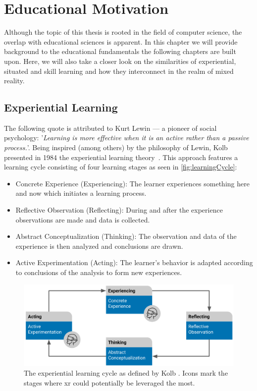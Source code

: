 %
\chapter{Educational Motivation \label{chap:concepts}}
Although the topic of this thesis is rooted in the field of computer science, the overlap with educational sciences is apparent. In this chapter we will provide background to the educational fundamentals the following chapters are built upon. Here, we will also take a closer look on the similarities of experiential, situated and skill learning and how they interconnect in the realm of mixed reality.


\section{Experiential Learning \label{sec:experiential}}
The following quote is attributed to Kurt Lewin --- a pioneer of social psychology: '\emph{Learning is more effective when it is an active rather than a passive process.}'.
Being inspired (among others) by the philosophy of Lewin, Kolb presented in 1984 the experiential learning theory~\cite{kolb:1984:experiential}.
This approach features a learning cycle consisting of four learning stages as seen in \autoref{fig:learningCycle}:

\begin{itemize}
    \setlength{\itemsep}{-0.3cm}
    \item Concrete Experience (Experiencing): The learner experiences something here and now which initiates a learning process.
    \item Reflective Observation (Reflecting): During and after the experience observations are made and data is collected.
    \item Abstract Conceptualization (Thinking): The observation and data of the experience is then analyzed and conclusions are drawn.
    \item Active Experimentation (Acting): The learner's behavior is adapted according to conclusions of the analysis to form new experiences. 
\end{itemize}

\begin{figure}[h!bt]
	\centering
	\includegraphics[width=0.9\linewidth]{pictures/ExperientialLearningCycle2.png}
	\captionsetup{labelfont=bf,textfont=it}
	\caption[The experiential learning cycle as defined by Kolb \cite{kolb:1984:experiential}.]{The experiential learning cycle as defined by Kolb \cite{kolb:1984:experiential}. Icons mark the stages where \acrshort{xr} could potentially be leveraged the most.\label{fig:learningCycle}}
\end{figure}

